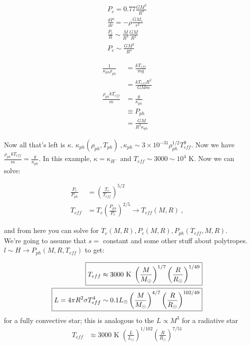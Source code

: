 \documentclass[10pt,letterpaper,final]{book}
\newcommand{\pt}{\propto}
\newcommand{\rp}{\right)}
\newcommand{\lp}{\left(}
\begin{document}
\begin{align}
P_c = 0.77 \frac{GM^2}{R^4}\\
\frac{dP}{dr} = -\rho \frac{GM_r}{r^2}\\
\frac{P_c}{R} \sim \frac{M}{R^3}\frac{GM}{R^2}\\
P_c \sim \frac{GM^2}{R^4}
\end{align}

\begin{align}
\frac{1}{\kappa_{ph}\rho_{ph}} &= \frac{kT_{eff}}{mg} \\
&= \frac{kT_{eff}R^2}{GMm}\\
\frac{\rho_{ph}kT_{eff}}{m} &= \frac{g}{\kappa_{ph}}\\
&\equiv P_{ph}\\
& = \frac{GM}{R^2\kappa_{ph}}
\end{align}

Now all that's left is $\kappa$. $\kappa_{ph}(\rho_{ph},T_{ph})~, \kappa_{ph} \sim 3 \times 10^{-31} \rho_{ph}^{1/2} T_{eff}^9$. Now we have $\frac{\rho_{ph} kT_{eff}}{m} = \frac{g}{\kappa_{ph}}$. In this example, $\kappa = \kappa_{H^-}$ and $T_{eff} \sim 3000 \sim 10^4$ K. Now we can solve:

\begin{align}
\frac{P_c}{P_{ph}}&= \lp \frac{T_c}{T_{eff}} \rp^{5/2}\\
T_{eff} &= T_c \lp \frac{P_{ph}}{P_c	} \rp ^{2/5}\rightarrow T_{eff}(M,R)~,
\end{align}

and from here you can solve for $T_c(M,R), P_c(M,R), P_{ph}(T_{eff},M,R)$.\\

We're going to assume that $s=$ constant and some other stuff about polytropes. $l \sim H \rightarrow P_{ph}(M,R,T_{eff})$ to get:

\begin{align}
\Aboxed{T_{eff} &\approx 3000 \text{ K }\lp \frac{M}{M_\odot} \rp^{1/7} \lp \frac{R}{R_\odot} \rp^{1/49}}\\
\Aboxed{L = 4 \pi R^2 \sigma T_{eff}^4 &\sim 0.1 L_\odot \lp \frac{M}{M_\odot} \rp^{4/7} \lp \frac{R}{R_\odot} \rp^{102/49}}
\end{align}
for a fully convective star; this is analogous to the $L \pt M^3$ for a radiative star
\begin{align}
T_{eff} &\approx 3000 \text{ K } \lp \frac{L}{L_\odot} \rp^{1/102} \lp \frac{R}{R_\odot} \rp^{7/51}
\end{align}
\end{document}

